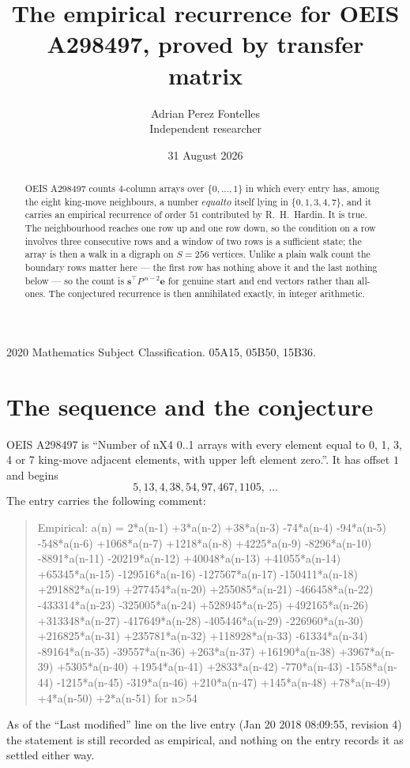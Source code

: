 \documentclass[11pt,a4paper]{article}
\title{The empirical recurrence for OEIS A298497, proved by transfer matrix}
\author{Adrian Perez Fontelles\\ \small Independent researcher}
\date{31 August 2026}
\theoremstyle{plain}
\theoremstyle{definition}
\begin{document}
\maketitle

\begin{abstract}
OEIS A298497 counts $4$-column arrays over $\{0,\dots,1\}$ in which every entry has,
among the eight king-move neighbours, a number $equal to$ itself lying in $\{0,1,3,4,7\}$, and it carries an empirical
recurrence of order $51$ contributed by R.~H.~Hardin. It is true. The neighbourhood
reaches one row up and one row down, so the condition on a row involves three consecutive
rows and a window of two rows is a sufficient state; the array is then a walk in a digraph
on $S=256$ vertices. Unlike a plain walk count the boundary rows matter here --- the first
row has nothing above it and the last nothing below --- so the count is
$\mathbf{s}^{\!\top}P^{\,n-2}\mathbf{e}$ for genuine start and end vectors rather than
all-ones. The conjectured recurrence is then annihilated exactly, in integer arithmetic.
\end{abstract}

\noindent\small 2020 Mathematics Subject Classification. 05A15, 05B50, 15B36.\normalsize

\section{The sequence and the conjecture}

OEIS A298497 is ``Number of nX4 0..1 arrays with every element equal to 0, 1, 3, 4 or 7 king-move adjacent elements, with upper left element zero.''. It has offset
$1$ and begins
\[
5, 13, 4, 38, 54, 97, 467, 1105,\ \dots
\]
The entry carries the following comment:
\begin{quote}\small
Empirical: a(n) = 2*a(n-1) +3*a(n-2) +38*a(n-3) -74*a(n-4) -94*a(n-5) -548*a(n-6) +1068*a(n-7) +1218*a(n-8) +4225*a(n-9) -8296*a(n-10) -8891*a(n-11) -20219*a(n-12) +40048*a(n-13) +41055*a(n-14) +65345*a(n-15) -129516*a(n-16) -127567*a(n-17) -150411*a(n-18) +291882*a(n-19) +277454*a(n-20) +255085*a(n-21) -466458*a(n-22) -433314*a(n-23) -325005*a(n-24) +528945*a(n-25) +492165*a(n-26) +313348*a(n-27) -417649*a(n-28) -405446*a(n-29) -226960*a(n-30) +216825*a(n-31) +235781*a(n-32) +118928*a(n-33) -61334*a(n-34) -89164*a(n-35) -39557*a(n-36) +263*a(n-37) +16190*a(n-38) +3967*a(n-39) +5305*a(n-40) +1954*a(n-41) +2833*a(n-42) -770*a(n-43) -1558*a(n-44) -1215*a(n-45) -319*a(n-46) +210*a(n-47) +145*a(n-48) +78*a(n-49) +4*a(n-50) +2*a(n-51) for n>54
\end{quote}
As of the ``Last modified'' line on the live entry (Jan 20 2018 08:09:55, revision
4) the statement is still recorded as empirical, and nothing on the entry
records it as settled either way.
\end{document}
